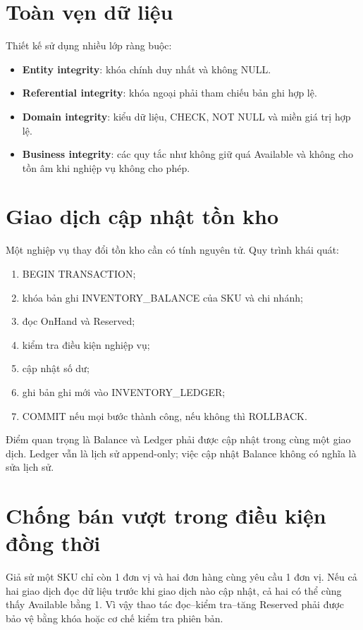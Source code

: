 \section{Toàn vẹn dữ liệu}

Thiết kế sử dụng nhiều lớp ràng buộc:
\begin{itemize}
    \item \textbf{Entity integrity}: khóa chính duy nhất và không NULL.
    \item \textbf{Referential integrity}: khóa ngoại phải tham chiếu bản ghi hợp lệ.
    \item \textbf{Domain integrity}: kiểu dữ liệu, CHECK, NOT NULL và miền giá trị hợp lệ.
    \item \textbf{Business integrity}: các quy tắc như không giữ quá Available và không cho tồn âm khi nghiệp vụ không cho phép.
\end{itemize}

\section{Giao dịch cập nhật tồn kho}

Một nghiệp vụ thay đổi tồn kho cần có tính nguyên tử. Quy trình khái quát:
\begin{enumerate}
    \item BEGIN TRANSACTION;
    \item khóa bản ghi INVENTORY\_BALANCE của SKU và chi nhánh;
    \item đọc OnHand và Reserved;
    \item kiểm tra điều kiện nghiệp vụ;
    \item cập nhật số dư;
    \item ghi bản ghi mới vào INVENTORY\_LEDGER;
    \item COMMIT nếu mọi bước thành công, nếu không thì ROLLBACK.
\end{enumerate}

Điểm quan trọng là Balance và Ledger phải được cập nhật trong cùng một giao dịch. Ledger vẫn là lịch sử append-only; việc cập nhật Balance không có nghĩa là sửa lịch sử.

\section{Chống bán vượt trong điều kiện đồng thời}

Giả sử một SKU chỉ còn 1 đơn vị và hai đơn hàng cùng yêu cầu 1 đơn vị. Nếu cả hai giao dịch đọc dữ liệu trước khi giao dịch nào cập nhật, cả hai có thể cùng thấy Available bằng 1. Vì vậy thao tác đọc--kiểm tra--tăng Reserved phải được bảo vệ bằng khóa hoặc cơ chế kiểm tra phiên bản.


